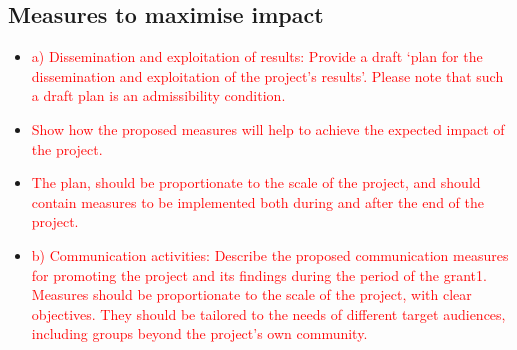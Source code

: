 \documentclass[11pt, a4paper]{article} %
\begin{document}
\subsection{Measures to maximise impact}

\begin{itemize}
\item \textcolor{red}{a) Dissemination and exploitation of results:
    Provide a draft ‘plan for the dissemination and exploitation of
    the project's results’. Please note that such a draft plan is an
    admissibility condition.}
\item \textcolor{red}{Show how the proposed measures will help to
    achieve the expected impact of the project.}
\item \textcolor{red}{The plan, should be proportionate to the scale
    of the project, and should contain measures to be implemented both
    during and after the end of the project.}
\item \textcolor{red}{b) Communication activities: Describe the
    proposed communication measures for promoting the project and its
    findings during the period of the grant1. Measures should be
    proportionate to the scale of the project, with clear
    objectives. They should be tailored to the needs of different
    target audiences, including groups beyond the project's own
    community. }
\end{itemize}
\end{document}
